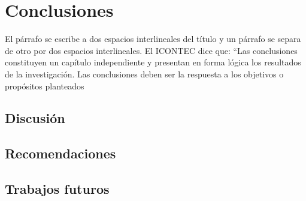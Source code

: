 %
\chapter{Conclusiones}
\label{ch::conslusions}

El párrafo se escribe a dos espacios interlineales del título y un párrafo se separa de otro por dos espacios interlineales. El ICONTEC dice que: “Las conclusiones constituyen un capítulo independiente y presentan en forma lógica los resultados de la investigación. Las conclusiones deben ser la respuesta a los objetivos o propósitos planteados

\section*{}
\label{sec:conclusiones}

\section{Discusión}
\label{sec:discusion}

\section{Recomendaciones}
\label{sec:recommendations}

\section{Trabajos futuros}
\label{sec:future_works}